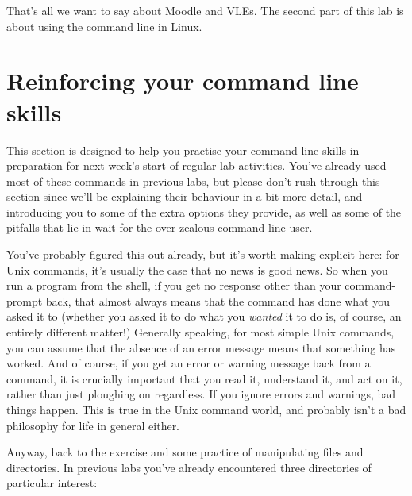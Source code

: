 That's all we want to say about Moodle and VLEs. The second part of this lab is about using the command line in Linux.


\section{Reinforcing your command line skills}
\newcommand{\ilinput}[1]{\ttout{#1}}
\newcommand{\crsname}{INTRO}
\newcommand{\Dcrsname}{\fname{/opt/info/courses/INTRO}}
\newcommand{\crsnamelc}{intro}
\newcommand{\return}{\relax}

This section is designed to help you practise your command line skills in preparation  for next week's start of regular lab activities. You've already used most of these commands in previous labs, but please don't rush through this section since we'll be explaining their behaviour in a bit more detail, and introducing you to some of the extra options they provide, as well as some of the pitfalls that lie in wait for the over-zealous command line user.  

You've probably figured this out already, but it's worth making explicit here: for Unix commands, it's usually the case that no news is good news. So when you run a program from the shell, if you get no response other than your command-prompt back, that almost always means that the command has done what you asked it to (whether you asked it to do what you \textit{wanted} it to do is, of course, an entirely different matter!) Generally speaking, for most simple Unix commands, you can assume that the absence of an error message means that something has worked. And of course, if you get an error or warning message back from a command, it is crucially important that you read it, understand it, and act on it, rather than just ploughing on regardless. If you ignore errors and warnings, bad things happen. This is true in the Unix command world, and probably isn't a bad philosophy for life in general either.

Anyway, back to the exercise and some practice of manipulating files and directories. In previous labs you've already encountered three directories of particular interest:

